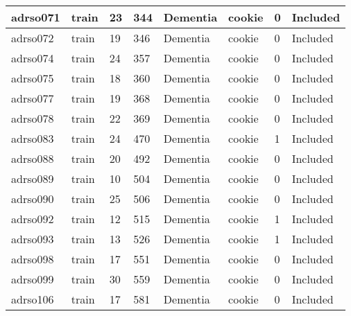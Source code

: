 \begin{center}
\begin{longtable}{|l|l|l|l|l|l|l|l|}
adrso071  & train            & 23           & 344         & Dementia             & cookie          & 0                & Included      \\ \hline
adrso072  & train            & 19           & 346         & Dementia             & cookie          & 0                & Included      \\ \hline
adrso074  & train            & 24           & 357         & Dementia             & cookie          & 0                & Included      \\ \hline
adrso075  & train            & 18           & 360         & Dementia             & cookie          & 0                & Included      \\ \hline
adrso077  & train            & 19           & 368         & Dementia             & cookie          & 0                & Included      \\ \hline
adrso078  & train            & 22           & 369         & Dementia             & cookie          & 0                & Included      \\ \hline
adrso083  & train            & 24           & 470         & Dementia             & cookie          & 1                & Included      \\ \hline
adrso088  & train            & 20           & 492         & Dementia             & cookie          & 0                & Included      \\ \hline
adrso089  & train            & 10           & 504         & Dementia             & cookie          & 0                & Included      \\ \hline
adrso090  & train            & 25           & 506         & Dementia             & cookie          & 0                & Included      \\ \hline
adrso092  & train            & 12           & 515         & Dementia             & cookie          & 1                & Included      \\ \hline
adrso093  & train            & 13           & 526         & Dementia             & cookie          & 1                & Included      \\ \hline
adrso098  & train            & 17           & 551         & Dementia             & cookie          & 0                & Included      \\ \hline
adrso099  & train            & 30           & 559         & Dementia             & cookie          & 0                & Included      \\ \hline
adrso106  & train            & 17           & 581         & Dementia             & cookie          & 0                & Included      \\ \hline

\end{longtable}
\end{center}
